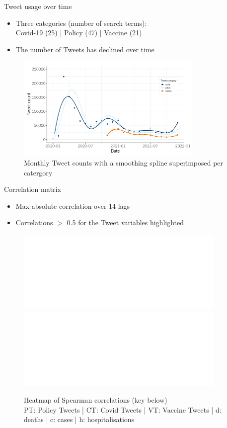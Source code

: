 \documentclass{beamer}
\begin{document}
\begin{frame}{Tweet usage over time}
  \begin{itemize}
  \item Three categories (number of search terms): \\ Covid-19 (25) | Policy
    (47) | Vaccine (21) \\[5pt]
  \item The number of Tweets has declined over time
  \end{itemize}
  \begin{figure}[!ht]
    \centering
    \includegraphics[width=0.8\textwidth]{figures/smoothing_spline_trend.pdf}
    \caption{Monthly Tweet counts with a smoothing spline superimposed per catergory}
  \end{figure} 
\end{frame}

\begin{frame}{Correlation matrix} 
  \begin{itemize}
  \item Max absolute correlation over 14 lags
  \item Correlations $>$ 0.5 for the Tweet variables highlighted
  \end{itemize}
 
  \begin{figure}[!ht]
    \centering
    \includegraphics<1>[width=0.9\textwidth]{figures/rrs_heatmap_formatted_wave2.pdf}%
    \includegraphics<2>[width=0.9\textwidth]{figures/rrs_heatmap_formatted_wave2_recs.pdf} 
    \caption{Heatmap of Spearman correlations (key below)\\PT: Policy Tweets | CT: Covid Tweets | VT: Vaccine Tweets | d: deaths | c: cases | h: hospitalisations}
  \end{figure} 
\end{frame}
\end{document}
